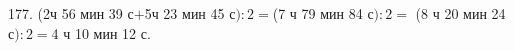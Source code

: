 177. (2ч 56 мин 39 с$+$5ч 23 мин 45 с$):2=$(7 ч 79 мин 84 с$):2=$ (8 ч 20 мин 24 с$):2=$4 ч 10 мин 12 с.\\
